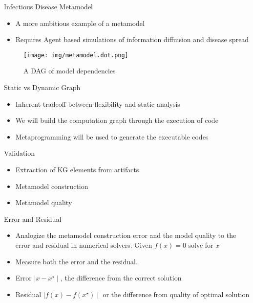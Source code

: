 \documentclass[ignorenonframetext,]{beamer}
\providecommand{\tightlist}{%
  \setlength{\itemsep}{0pt}\setlength{\parskip}{0pt}}
\begin{document}
\begin{frame}{Infectious Disease Metamodel}
\protect\hypertarget{infectious-disease-metamodel}{}

\begin{itemize}
\tightlist
\item
  A more ambitious example of a metamodel
\item
  Requires Agent based simulations of information diffuision and disease
  spread
\end{itemize}
\begin{figure}
\centering
\texttt{[image: img/metamodel.dot.png]}
\caption{A DAG of model dependencies}
\end{figure}

\end{frame}

\begin{frame}{Static vs Dynamic Graph}
\protect\hypertarget{static-vs-dynamic-graph}{}

\begin{itemize}
\tightlist
\item
  Inherent tradeoff between flexibility and static analysis
\item
  We will build the computation graph through the execution of code
\item
  Metaprogramming will be used to generate the executable codes
\end{itemize}

\end{frame}

\begin{frame}{Validation}
\protect\hypertarget{validation}{}

\begin{itemize}
\tightlist
\item
  Extraction of KG elements from artifacts
\item
  Metamodel construction
\item
  Metamodel quality
\end{itemize}

\begin{block}{Error and Residual}

\begin{itemize}
\item
  Analogize the metamodel construction error and the model quality to
  the error and residual in numerical solvers. Given \(f(x)=0\) solve
  for \(x\)
\item
  Measure both the error and the residual.
\item
  Error \(\mid x-x^\star\mid\), the difference from the correct solution
\item
  Residual \(\mid f(x) - f(x^\star)\mid\) or the difference from quality
  of optimal solution
\end{itemize}

\end{block}

\end{frame}
\end{document}
